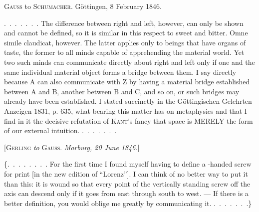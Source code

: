 %
\begin{center}
\textsc{Gauss} to \textsc{Schumacher}. Göttingen, 8 February 1846.
\end{center}

\mbox{.\ .\ .\ .\ .\ .\ .} The difference between right and left, however, can only be shown and cannot be defined, so it is similar in this respect to sweet and bitter. Omne simile claudicat, however. The latter applies only to beings that have organs of taste, the former to all minds capable of apprehending the material world. Yet two such minds can communicate directly about right and left only if one and the same individual material object forms a bridge between them. I say directly because A can also communicate with Z by having a material bridge established between A and B, another between B and C, and so on, or such bridges may already have been established. I stated succinctly in the Göttingischen Gelehrten Anzeigen 1831, p. 635, what bearing this matter has on metaphysics and that I find in it the decisive refutation of \textsc{Kant}'s fancy that space is MERELY the form of our external intuition. \mbox{.\ .\ .\ .\ .\ .\ .}

\par\bigskip

\begin{center}
[\textsc{Gerling} \emph{to} \textsc{Gauss}. \emph{Marburg, 20 June 1846.}]
\end{center}

\{\mbox{.\ .\ .\ .\ .\ .\ .\ .} For the first time I found myself having to define a -handed screw for print [in the new edition of “Lorenz”]. I can think of no better way to put it than this: it is wound so that every point of the vertically standing screw off the axis can descend only if it goes from east through south to west. --- If there is a better definition, you would oblige me greatly by communicating it. \mbox{.\ .\ .\ .\ .\ .\ .}\}

\par\bigskip

